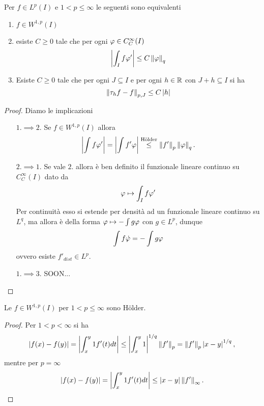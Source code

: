 \begin{proposition}\label{PrCaratterizzazioniSpazioDiSobolev}
Per $f\in L^p(I)$ e $1< p\leq\infty$ le seguenti sono equivalenti
\begin{enumerate}
    \item $f\in W^{1,p}(I)$
    \item esiste $C\geq 0$ tale che per ogni $\varphi\in C^\infty_C(I)$
    \[\left|{\int_I f\varphi'}\right|\leq C\left\Vert{\varphi}\right\Vert_{q}\]
    \item Esiste $C\geq 0$ tale che per ogni $J\subseteq I$ e per ogni $h\in \mathbb{R}$ con $J+h\subseteq I$ si ha
    \[\left\Vert{\tau_h f-f}\right\Vert_{p,J}\leq C\left|{h}\right|\]
\end{enumerate}
\end{proposition}
\begin{proof}
Diamo le implicazioni
\setlength{\leftmargini}{0cm}
\begin{itemize}
\item[$\boxed{1.\implies2.}$] Se $f\in W^{1,p}(I)$ allora
\[\left|{\int f\varphi'}\right|=\left|{\int f'\varphi}\right|\overset{\text{H\"older}}\leq \left\Vert{f'}\right\Vert_p\left\Vert{\varphi}\right\Vert_q.\]
\item[$\boxed{2.\implies1.}$] Se vale $2.$ allora \`e ben definito il funzionale lineare continuo su $C^\infty_C(I)$ dato da
\[\varphi\mapsto \int_I f\varphi'\]
Per continuit\`a esso si estende per densit\`a ad un funzionale lineare continuo su $L^q$, ma allora \`e della forma $\varphi\mapsto -\int g\varphi$ con $g\in L^p$, dunque
\[\int f\dot{\varphi}=-\int g\varphi\]
ovvero esiste $f'_{dist}\in L^p$.
\item[$\boxed{1.\implies3.}$] SOON...

\end{itemize}
\setlength{\leftmargini}{0.5cm}
\end{proof}


\begin{proposition}[]\label{PrElementiDiSpazioDiSobolevSonoHolderiani}
Le $f\in W^{1,p}(I)$ per $1<p\leq \infty$ sono H\"older. 
\end{proposition}
\begin{proof}
Per $1<p<\infty$ si ha
\[\left|{f(x)-f(y)}\right|=\left|{\int_x^y1f'(t)dt}\right|\leq \left|{\int_x^y1}\right|^{1/q}\left\Vert{f'}\right\Vert_p=\left\Vert{f'}\right\Vert_p\left|{x-y}\right|^{1/q},\]
mentre per $p=\infty$
\[\left|{f(x)-f(y)}\right|=\left|{\int_x^y1f'(t)dt}\right|\leq\left|{x-y}\right|\left\Vert{f'}\right\Vert_\infty.\]
\end{proof}


